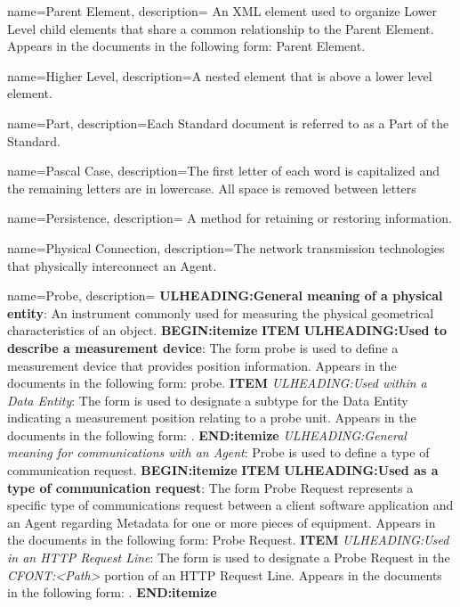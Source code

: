 {
    name={Parent Element},
	description={
	An XML element used to organize \gls{Lower Level} child elements that share a common relationship to the \gls{Parent Element}.
	Appears in the documents in the following form: \gls{Parent Element}.
}
}

{
    name={Higher Level},
	description={A nested element that is above a lower level element.}
}

{
    name={Part},
	description={Each Standard document is referred to as a \gls{Part} of the Standard.}
}

{
    name={Pascal Case},
	description={The first letter of each word is capitalized and the remaining letters are in lowercase. All space is removed between letters}
}

{
    name={Persistence},
	description={
	A method for retaining or restoring information.
}
}

{
    name={Physical Connection},
	description={The network transmission technologies that physically interconnect an \gls{Agent}.}
}

{
    name={Probe},
	description={
	\textbf{ULHEADING:General meaning of a physical entity}:
	An instrument commonly used for measuring the physical geometrical characteristics of an object.
    \textbf{BEGIN:itemize}
	\textbf{ITEM} \textbf{ULHEADING:Used to describe a measurement device}:
	The form probe is used to define a measurement device that provides position information.
	Appears in the documents in the following form: probe. 
	\textbf{ITEM} \textit{ULHEADING:Used within a \gls{Data Entity}}:
	The form  is used to designate a subtype for the \gls{Data Entity}  indicating a measurement position relating to a probe unit.
	Appears in the documents in the following form: .
    \textbf{END:itemize}
	\textit{ULHEADING:General meaning for communications with an \gls{Agent}}:
	Probe is used to define a type of communication request. 
    \textbf{BEGIN:itemize}
	\textbf{ITEM} \textbf{ULHEADING:Used as a type of communication request}:
	The form \gls{Probe Request} represents a specific type of communications request between a client software application and an \gls{Agent} regarding \gls{Metadata} for one or more pieces of equipment.
	Appears in the documents in the following form: \gls{Probe Request}.
	\textbf{ITEM} \textit{ULHEADING:Used in an \gls{HTTP Request Line}}:
	The form  is used to designate a \gls{Probe Request} in the \textit{CFONT:<Path>} portion of an \gls{HTTP Request Line}.
	Appears in the documents in the following form: .
    \textbf{END:itemize}
}
}


